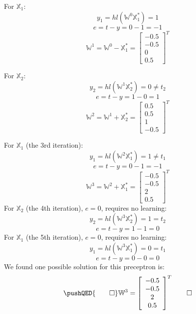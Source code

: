 For $\mathbb{X}_1$:
\[y_1=hl(\mathbb{W}^{0}\mathbb{X}_1^{*})=1\]
\[e = t-y = 0-1 = -1\]
\[\mathbb{W}^1 = \mathbb{W}^0-\mathbb{X}_{1}^{*}=\left[ {\begin{array}{*{20}{c}}
{-0.5}\\
{-0.5}\\
{0}\\
{0.5}
\end{array}} \right]^{T}
\]

For $\mathbb{X}_2$:
\[y_2=hl(\mathbb{W}^{1}\mathbb{X}_2^{*})=0 \ne {t_2}\]
\[e = t-y = 1-0 = 1\]
\[\mathbb{W}^2 = \mathbb{W}^1+\mathbb{X}_{2}^{*}=\left[ {\begin{array}{*{20}{c}}
{0.5}\\
{0.5}\\
{1}\\
{-0.5}
\end{array}} \right]^{T}
\]

For $\mathbb{X}_1$ (the 3rd iteration):
\[y_1=hl(\mathbb{W}^{2}\mathbb{X}_1^{*})=1 \ne {t_1}\]
\[e = t-y = 0-1 = -1\]
\[\mathbb{W}^3 = \mathbb{W}^2+\mathbb{X}_{1}^{*}=\left[ {\begin{array}{*{20}{c}}
{-0.5}\\
{-0.5}\\
{2}\\
{0.5}
\end{array}} \right]^{T}
\]
For $\mathbb{X}_2$ (the 4th iteration), $e=0$, requires no learning:
\[y_2=hl(\mathbb{W}^{3}\mathbb{X}_2^{*})=1 = {t_2}\]
\[e = t-y = 1-1 = 0\]
For $\mathbb{X}_1$ (the 5th iteration), $e=0$, requires no learning:
\[y_1=hl(\mathbb{W}^{3}\mathbb{X}_1^{*})=0 = {t_1}\]
\[e = t-y = 0-0 = 0\]
We found one possible solution for this preceptron is: 
\[
\pushQED{\qed} 
\mathbb{W}^3 = \left[ {\begin{array}{*{20}{c}}
{-0.5}\\
{-0.5}\\
{2}\\
{0.5}
\end{array}} \right]^{T}\qedhere
\]

